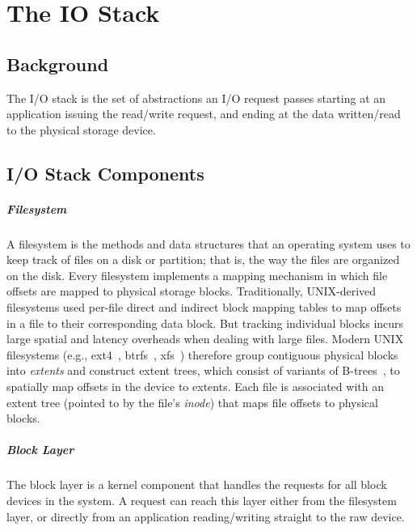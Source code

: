 \chapter{The IO Stack}
\label{chap:iostack}

\section{Background}
The I/O stack is the set of abstractions an I/O request passes starting at an application issuing the read/write request, and ending at the data written/read to the physical storage device. 


\section{I/O Stack Components}

\paragraph{Filesystem}
A filesystem is the methods and data structures that an operating system uses to keep track of files on a disk or partition; that is, the way the files are organized on the disk.
Every filesystem implements a mapping mechanism in which file offsets are mapped to physical storage blocks.
Traditionally, UNIX-derived filesystems used per-file direct and indirect  block mapping tables to map offsets in a file to their corresponding data block. But tracking individual blocks incurs large spatial and latency
overheads when dealing with large files. Modern UNIX filesystems (e.g., ext4~\cite{mathur07ext4},
btrfs~\cite{rodeh13btrfs}, xfs~\cite{sweeney96xfs}) therefore group contiguous physical blocks into
\emph{extents} and construct extent trees, which consist of variants of B-trees~\cite{comer79btree}, to spatially
map offsets in the device to extents.
Each file is associated with an extent tree (pointed to by the file's \emph{inode}) that maps file offsets to
physical blocks.

\paragraph{Block Layer}
The block layer is a kernel component that handles the requests for all block devices in the system.
A request can reach this layer either from the filesystem layer, or directly from an application reading/writing straight to the raw device.


